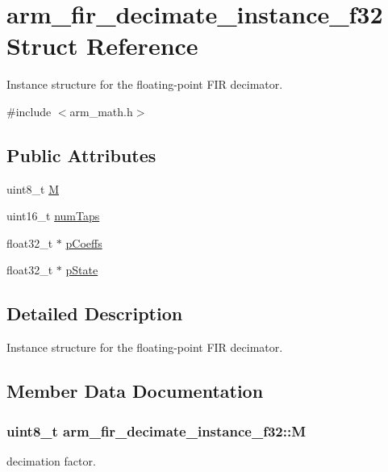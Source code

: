 \hypertarget{structarm__fir__decimate__instance__f32}{}\section{arm\+\_\+fir\+\_\+decimate\+\_\+instance\+\_\+f32 Struct Reference}
\label{structarm__fir__decimate__instance__f32}


Instance structure for the floating-\/point F\+IR decimator.  




{\ttfamily \#include $<$arm\+\_\+math.\+h$>$}

\subsection*{Public Attributes}
\begin{DoxyCompactItemize}
\item 
uint8\+\_\+t \hyperlink{structarm__fir__decimate__instance__f32_a76a8b2161731638eb3d67f277919f95d}{M}
\item 
uint16\+\_\+t \hyperlink{structarm__fir__decimate__instance__f32_a2aa2986129db8affef03ede88dd45a03}{num\+Taps}
\item 
float32\+\_\+t $\ast$ \hyperlink{structarm__fir__decimate__instance__f32_a268a8b0e80a3d9764baf33e4bc10dde2}{p\+Coeffs}
\item 
float32\+\_\+t $\ast$ \hyperlink{structarm__fir__decimate__instance__f32_a5bddf29aaaf2011d2e3bcec59a83f633}{p\+State}
\end{DoxyCompactItemize}


\subsection{Detailed Description}
Instance structure for the floating-\/point F\+IR decimator. 

\subsection{Member Data Documentation}
\subsubsection[{\texorpdfstring{M}{M}}]{\setlength{\rightskip}{0pt plus 5cm}uint8\+\_\+t arm\+\_\+fir\+\_\+decimate\+\_\+instance\+\_\+f32\+::M}\hypertarget{structarm__fir__decimate__instance__f32_a76a8b2161731638eb3d67f277919f95d}{}\label{structarm__fir__decimate__instance__f32_a76a8b2161731638eb3d67f277919f95d}
decimation factor. 
